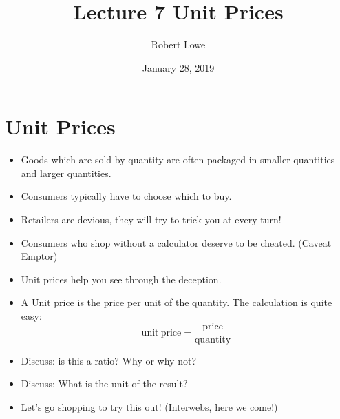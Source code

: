 \documentclass{article}
\title{Lecture 7 Unit Prices}
\author{Robert Lowe}
\date{January 28, 2019}
\begin{document}
\maketitle

\section*{Unit Prices}
\begin{itemize}
\item Goods which are sold by quantity are often packaged in smaller quantities and larger quantities.
\item Consumers typically have to choose which to buy.
\item Retailers are devious, they will try to trick you at every turn!
\item Consumers who shop without a calculator deserve to be cheated. (Caveat Emptor)
\item Unit prices help you see through the deception.
\item A Unit price is the price per unit of the quantity.  The calculation is quite easy:\newline
\[
    \mathrm{unit\ price} = \dfrac{\mathrm{price}}{\mathrm{quantity}}
\]
\item Discuss: is this a ratio? Why or why not?
\item Discuss: What is the unit of the result?
\item Let's go shopping to try this out!  (Interwebs, here we come!)
\end{itemize}
\end{document}
